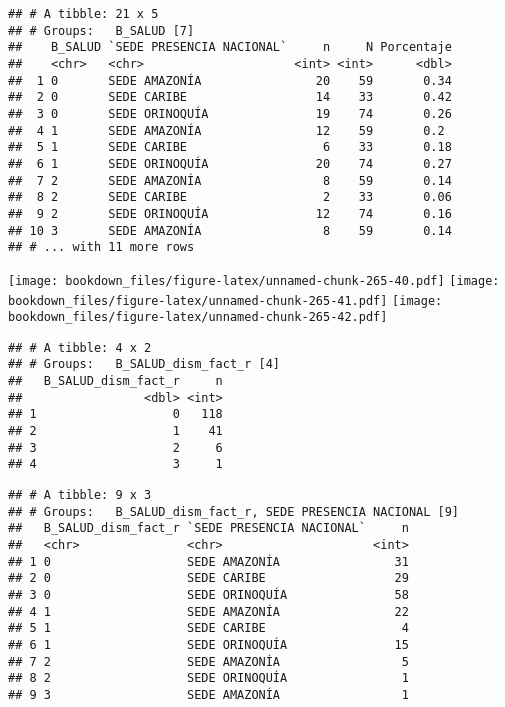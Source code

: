\documentclass[]{article}
\theoremstyle{definition}
\theoremstyle{definition}
\theoremstyle{definition}
\theoremstyle{remark}
\begin{document}
\begin{verbatim}
## # A tibble: 21 x 5
## # Groups:   B_SALUD [7]
##    B_SALUD `SEDE PRESENCIA NACIONAL`     n     N Porcentaje
##    <chr>   <chr>                     <int> <int>      <dbl>
##  1 0       SEDE AMAZONÍA                20    59       0.34
##  2 0       SEDE CARIBE                  14    33       0.42
##  3 0       SEDE ORINOQUÍA               19    74       0.26
##  4 1       SEDE AMAZONÍA                12    59       0.2 
##  5 1       SEDE CARIBE                   6    33       0.18
##  6 1       SEDE ORINOQUÍA               20    74       0.27
##  7 2       SEDE AMAZONÍA                 8    59       0.14
##  8 2       SEDE CARIBE                   2    33       0.06
##  9 2       SEDE ORINOQUÍA               12    74       0.16
## 10 3       SEDE AMAZONÍA                 8    59       0.14
## # ... with 11 more rows
\end{verbatim}

\texttt{[image: bookdown\_files/figure-latex/unnamed-chunk-265-40.pdf]}
\texttt{[image: bookdown\_files/figure-latex/unnamed-chunk-265-41.pdf]}
\texttt{[image: bookdown\_files/figure-latex/unnamed-chunk-265-42.pdf]}

\begin{verbatim}
## # A tibble: 4 x 2
## # Groups:   B_SALUD_dism_fact_r [4]
##   B_SALUD_dism_fact_r     n
##                 <dbl> <int>
## 1                   0   118
## 2                   1    41
## 3                   2     6
## 4                   3     1
\end{verbatim}

\begin{verbatim}
## # A tibble: 9 x 3
## # Groups:   B_SALUD_dism_fact_r, SEDE PRESENCIA NACIONAL [9]
##   B_SALUD_dism_fact_r `SEDE PRESENCIA NACIONAL`     n
##   <chr>               <chr>                     <int>
## 1 0                   SEDE AMAZONÍA                31
## 2 0                   SEDE CARIBE                  29
## 3 0                   SEDE ORINOQUÍA               58
## 4 1                   SEDE AMAZONÍA                22
## 5 1                   SEDE CARIBE                   4
## 6 1                   SEDE ORINOQUÍA               15
## 7 2                   SEDE AMAZONÍA                 5
## 8 2                   SEDE ORINOQUÍA                1
## 9 3                   SEDE AMAZONÍA                 1
\end{verbatim}
\end{document}

